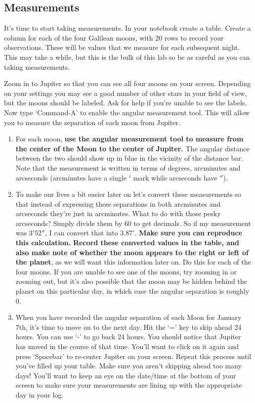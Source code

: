 \documentclass[12pt]{article}%
\begin{document}
\subsection*{Measurements}
It's time to start taking measurements. In your notebook create a table. Create a column for each of the four Galilean moons, with 20 rows to record your observations. These will be values that we measure for each subsequent night. This may take a while, but this is the bulk of this lab so be as careful as you can taking measurements. 

Zoom in to Jupiter so that you can see all four moons on your screen. Depending on your settings you may see a good number of other stars in your field of view, but the moons should be labeled. Ask for help if you're unable to see the labels. Now type `Command-A' to enable the angular measurement tool. This will allow you to measure the separation of each moon from Jupiter.

\begin{enumerate}
    \item For each moon, \textbf{use the angular measurement tool to measure from the center of the Moon to the center of Jupiter.} The angular distance between the two should show up in blue in the vicinity of the distance bar. Note that the measurement is written in terms of degrees, arcminutes and arcseconds (arcminutes have a single $'$ mark while arcseconds have $''$). 
    \item To make our lives a bit easier later on let's convert these measurements so that instead of expressing these separations in both arcminutes and arcseconds they're just in arcminutes. What to do with those pesky arcseconds? Simply divide them by 60 to get decimals. So if my measurement was $3' 52''$, I can convert that into $3.87'$. \textbf{Make sure you can reproduce this calculation.} \textbf{Record these converted values in the table, and also make note of whether the moon appears to the right or left of the planet}, as we will want this information later on. Do this for each of the four moons. If you are unable to see one of the moons, try zooming in or zooming out, but it's also possible that the moon may be hidden behind the planet on this particular day, in which case the angular separation is roughly 0.
    \item When you have recorded the angular separation of each Moon for January 7th, it's time to move on to the next day. Hit the `=' key to skip ahead 24 hours. You can use `-' to go back 24 hours. You should notice that Jupiter has moved in the course of that time. You'll want to click on it again and press `Spacebar' to re-center Jupiter on your screen. Repeat this process until you've filled up your table. Make sure you aren't skipping ahead too many days! You'll want to keep an eye on the date/time at the bottom of your screen to make sure your measurements are lining up with the appropriate day in your log.
\end{enumerate}
\end{document}
